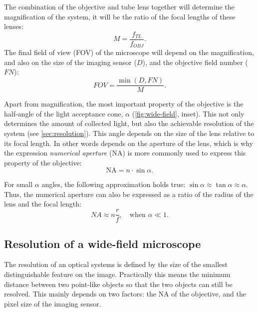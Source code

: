     The combination of the objective and tube lens together will determine the magnification of the system, it will be the ratio of the focal lengths of these lenses:
    \begin{equation}
      M = \frac{f_{TL}}{f_{OBJ}}.
      \label{eq:magnification}
    \end{equation}
    The final field of view (FOV) of the microscope will depend on the magnification, and also on the size of the imaging sensor ($D$), and the objective field number ($FN$):
    \begin{equation}
      FOV = \frac{\min(D, FN)}{M}.
      \label{eq:FOV}
    \end{equation}

    Apart from magnification, the most important property of the objective is the half-angle of the light acceptance cone, $\alpha$ (\autoref{fig:wide-field}, inset). This not only determines the amount of collected light, but also the achievable resolution of the system (see \autoref{sec:resolution}). This angle depends on the size of the lens relative to its focal length. In other words depends on the aperture of the lens, which is why the expression \textit{numerical aperture} (NA) is more commonly used to express this property of the objective:
    \begin{equation}
      \text{NA} = n\cdot \sin \alpha.
      \label{eq:NA}
    \end{equation}

    For small $\alpha$ angles, the following approximation holds true: $\sin \alpha \approx \tan \alpha \approx \alpha$. Thus, the numerical aperture can also be expressed as a ratio of the radius of the lens and the focal length:
    \begin{equation}
      NA \approx n \frac{r}{f},\quad \text{when }\alpha \ll 1.
    \end{equation}



  \subsection{Resolution of a wide-field microscope}
    \label{sec:resolution}
    The resolution of an optical systems is defined by the size of the smallest distinguishable feature on the image. Practically this means the minimum distance between two point-like objects so that the two objects can still be resolved. This mainly depends on two factors: the NA of the objective, and the pixel size of the imaging sensor.


